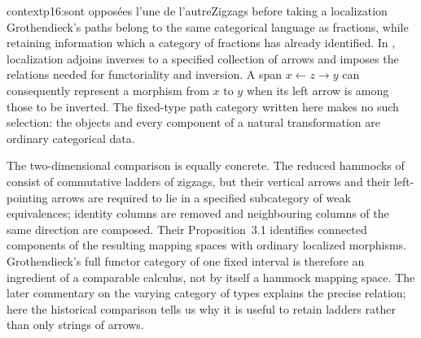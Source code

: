 \begin{dcomment}{context}{p16:sont opposées l'une de l'autre}{Zigzags before taking a localization}
Grothendieck's paths belong to the same categorical language as fractions, while retaining information which a category of fractions has already identified. In \citet[Chapter~I, \S1.1]{GabrielZisman1967}, localization adjoins inverses to a specified collection of arrows and imposes the relations needed for functoriality and inversion. A span $x\leftarrow z\to y$ can consequently represent a morphism from $x$ to $y$ when its left arrow is among those to be inverted. The fixed-type path category written here makes no such selection: the objects and every component of a natural transformation are ordinary categorical data.

The two-dimensional comparison is equally concrete. The reduced hammocks of \citet[Definition~2.1]{DwyerKan1980Calculating} consist of commutative ladders of zigzags, but their vertical arrows and their left-pointing arrows are required to lie in a specified subcategory of weak equivalences; identity columns are removed and neighbouring columns of the same direction are composed. Their Proposition~3.1 identifies connected components of the resulting mapping spaces with ordinary localized morphisms. Grothendieck's full functor category of one fixed interval is therefore an ingredient of a comparable calculus, not by itself a hammock mapping space. The later commentary on the varying category of types explains the precise relation; here the historical comparison tells us why it is useful to retain ladders rather than only strings of arrows.
\end{dcomment}

